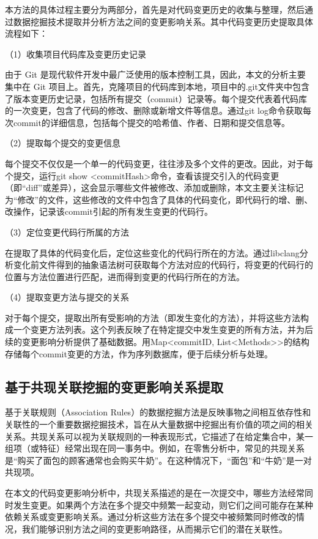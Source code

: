 本方法的具体过程主要分为两部分，首先是对代码变更历史的收集与整理，然后通过数据挖掘技术提取并分析方法之间的变更影响关系。其中代码变更历史提取具体流程如下：

（1）收集项目代码库及变更历史记录

由于 Git 是现代软件开发中最广泛使用的版本控制工具，因此，本文的分析主要集中在 Git 项目上。首先，克隆项目的代码库到本地，项目中的.git文件夹中包含了版本变更历史记录，包括所有提交（commit）记录等。每个提交代表着代码库的一次变更，包含了代码的修改、删除或新增文件等信息。通过git log命令获取每次commit的详细信息，包括每个提交的哈希值、作者、日期和提交信息等。

（2）提取每个提交的变更信息

每个提交不仅仅是一个单一的代码变更，往往涉及多个文件的更改。因此，对于每个提交，运行git show <commitHash>命令，查看该提交引入的代码变更（即“diff”或差异），这会显示哪些文件被修改、添加或删除，本文主要关注标记为“修改”的文件，这些修改的文件中包含了具体的代码变化，即代码行的增、删、改操作，记录该commit引起的所有发生变更的代码行。

（3）定位变更代码行所属的方法

在提取了具体的代码变化后，定位这些变化的代码行所在的方法。通过libclang分析变化前文件得到的抽象语法树可获取每个方法对应的代码行，将变更的代码行的位置与方法位置进行匹配，进而得到变更的代码行所在的方法。

（4）提取变更方法与提交的关系

对于每个提交，提取出所有受影响的方法（即发生变化的方法），并将这些方法构成一个变更方法列表。这个列表反映了在特定提交中发生变更的所有方法，并为后续的变更影响分析提供了基础数据。用Map<commitID, List<Methods>>的结构存储每个commit变更的方法，作为序列数据库，便于后续分析与处理。


\subsection{基于共现关联挖掘的变更影响关系提取}

基于关联规则（Association Rules）的数据挖掘方法是反映事物之间相互依存性和关联性的一个重要数据挖掘技术，旨在从大量数据中挖掘出有价值的项之间的相关关系。共现关系可以视为关联规则的一种表现形式，它描述了在给定集合中，某一组项（或特征）经常出现在同一事务中。例如，在零售分析中，常见的共现关系是“购买了面包的顾客通常也会购买牛奶”。在这种情况下，“面包”和“牛奶”是一对共现项。

在本文的代码变更影响分析中，共现关系描述的是在一次提交中，哪些方法经常同时发生变更。如果两个方法在多个提交中频繁一起变动，则它们之间可能存在某种依赖关系或变更影响关系。通过分析这些方法在多个提交中被频繁同时修改的情况，我们能够识别方法之间的变更影响路径，从而揭示它们的潜在关联性。


